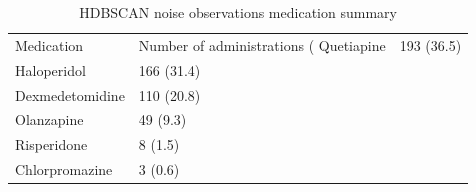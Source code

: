 \begin{table}

\caption{HDBSCAN noise observations medication summary}
\centering
\begin{tabular}[t]{ll}
\toprule
Medication & Number of administrations (%
\midrule
Quetiapine & 193 (36.5)\\
Haloperidol & 166 (31.4)\\
Dexmedetomidine & 110 (20.8)\\
Olanzapine & 49 (9.3)\\
Risperidone & 8 (1.5)\\
\addlinespace
Chlorpromazine & 3 (0.6)\\
\bottomrule
\end{tabular}
\end{table}
